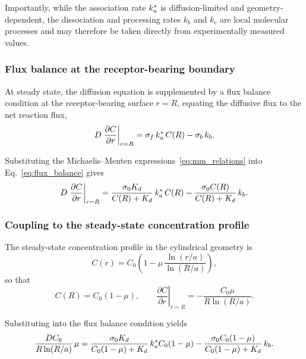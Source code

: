 Importantly, while the association rate $k_a^{*}$ is diffusion-limited and geometry-dependent, the dissociation and processing rates $k_b$ and $k_c$ are local molecular processes and may therefore be taken directly from experimentally measured values.

\subsubsection{Flux balance at the receptor-bearing boundary}
\label{sec:flux_balance}

At steady state, the diffusion equation is supplemented by a flux balance condition at the receptor-bearing surface $r = R$, equating the diffusive flux to the net reaction flux,
\begin{equation}
    D \left.\frac{\partial C}{\partial r}\right|_{r=R} = \sigma_f \, k_a^{*} \, C(R) - \sigma_b \, k_b.
    \label{eq:flux_balance}
\end{equation}

Substituting the Michaelis--Menten expressions~\eqref{eq:mm_relations} into Eq.~\eqref{eq:flux_balance} gives
\begin{equation}
    D \left.\frac{\partial C}{\partial r}\right|_{r=R} = \frac{\sigma_0 K_d}{C(R) + K_d}\,k_a^{*} \, C(R) - \frac{\sigma_0 C(R)}{C(R) + K_d}\, k_b.
    \label{eq:flux_balance_mm}
\end{equation}

\subsubsection{Coupling to the steady-state concentration profile}
\label{sec:coupling}

The steady-state concentration profile in the cylindrical geometry is
\begin{equation}
    C(r) = C_{0}\left(1 - \mu \,\frac{\ln(r/a)}{\ln(R/a)}\right),
    \label{eq:C_profile_coupling}
\end{equation}
so that
\begin{equation}
    C(R) = C_{0}(1 - \mu), \qquad \left.\frac{\partial C}{\partial r}\right|_{r=R} = -\frac{C_{0}\mu}{R\ln(R/a)}.
    \label{eq:CR_dCdr}
\end{equation}

Substituting into the flux balance condition yields
\begin{equation}
    \frac{D C_{0}}{R \ln(R/a)}\,\mu = \frac{\sigma_0 K_d}{C_{0}(1-\mu) + K_d}\,k_a^{*} C_{0}(1-\mu) - \frac{\sigma_0 C_{0}(1-\mu)}{C_{0}(1-\mu) + K_d}\,k_b.
    \label{eq:flux_balance_subst}
\end{equation}

